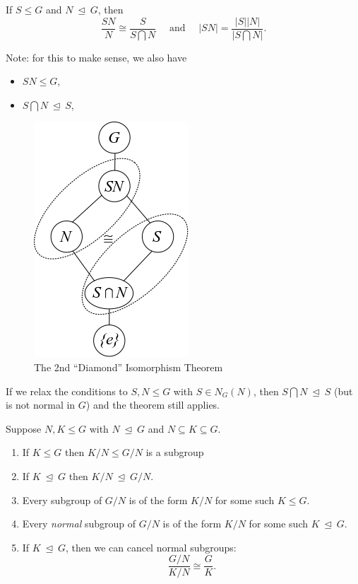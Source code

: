 If \(S \leq G\) and \(N {~\trianglelefteq~}G\), then \[
\frac{SN}{N} \cong \frac{S}{S\bigcap N} \quad \text{ and }\quad {\left\lvert {SN} \right\rvert} = \frac{{\left\lvert {S} \right\rvert} {\left\lvert {N} \right\rvert}}{{\left\lvert {S\bigcap N} \right\rvert}}
.\]

Note: for this to make sense, we also have

\begin{itemize}
\tightlist
\item
  \(SN \leq G\),
\item
  \(S\bigcap N {~\trianglelefteq~}S\),
\end{itemize}

\begin{figure}
\centering
\includegraphics{figures/2020-01-01-15-20-27.png}
\caption{The 2nd ``Diamond'' Isomorphism Theorem}
\end{figure}

If we relax the conditions to \(S, N \leq G\) with \(S \in N_G(N)\),
then \(S\bigcap N {~\trianglelefteq~}S\) (but is not normal in \(G\))
and the theorem still applies.

Suppose \(N, K \leq G\) with \(N {~\trianglelefteq~}G\) and
\(N\subseteq K \subseteq G\).

\begin{enumerate}
\def\labelenumi{\arabic{enumi}.}
\tightlist
\item
  If \(K\leq G\) then \(K/N \leq G/N\) is a subgroup
\item
  If \(K{~\trianglelefteq~}G\) then \(K/N {~\trianglelefteq~}G/N\).
\item
  Every subgroup of \(G/N\) is of the form \(K/N\) for some such
  \(K \leq G\).
\item
  Every \emph{normal} subgroup of \(G/N\) is of the form \(K/N\) for
  some such \(K {~\trianglelefteq~}G\).
\item
  If \(K{~\trianglelefteq~}G\), then we can cancel normal subgroups:
  \[  
  \frac{G/N}{K/N} \cong \frac{G}{K}
  .\]
\end{enumerate}

